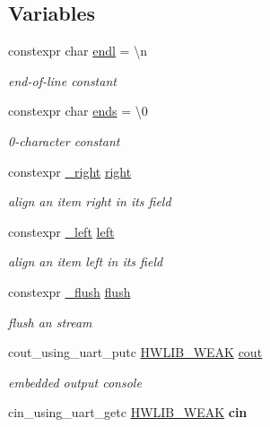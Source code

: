 \subsection*{Variables}
\begin{DoxyCompactItemize}
\item 
constexpr char \hyperlink{namespacehwlib_a89ce110cc897f61657f1edca18e4cef7}{endl} = \textquotesingle{}\textbackslash{}n\textquotesingle{}\hypertarget{namespacehwlib_a89ce110cc897f61657f1edca18e4cef7}{}\label{namespacehwlib_a89ce110cc897f61657f1edca18e4cef7}

\begin{DoxyCompactList}\small\item\em end-\/of-\/line constant \end{DoxyCompactList}\item 
constexpr char \hyperlink{namespacehwlib_ac708935d0fc9beb71bb55a7c35e69a16}{ends} = \textquotesingle{}\textbackslash{}0\textquotesingle{}\hypertarget{namespacehwlib_ac708935d0fc9beb71bb55a7c35e69a16}{}\label{namespacehwlib_ac708935d0fc9beb71bb55a7c35e69a16}

\begin{DoxyCompactList}\small\item\em 0-\/character constant \end{DoxyCompactList}\item 
constexpr \hyperlink{structhwlib_1_1__right}{\+\_\+right} \hyperlink{namespacehwlib_a26a6aead1d4dc1a990ab77bf2b730740}{right}
\begin{DoxyCompactList}\small\item\em align an item right in its field \end{DoxyCompactList}\item 
constexpr \hyperlink{structhwlib_1_1__left}{\+\_\+left} \hyperlink{namespacehwlib_a7d9a4ef3e66da75048c5b3e67cf401d8}{left}
\begin{DoxyCompactList}\small\item\em align an item left in its field \end{DoxyCompactList}\item 
constexpr \hyperlink{structhwlib_1_1__flush}{\+\_\+flush} \hyperlink{namespacehwlib_a648fe94ca9899747a632c23f97007732}{flush}
\begin{DoxyCompactList}\small\item\em flush an stream \end{DoxyCompactList}\item 
cout\+\_\+using\+\_\+uart\+\_\+putc \hyperlink{hwlib-defines_8hpp_a04be4340016df60d6636c1d1c6d94fc9}{H\+W\+L\+I\+B\+\_\+\+W\+E\+AK} \hyperlink{namespacehwlib_ac985c212834e4eb219aedede6efff2dc}{cout}
\begin{DoxyCompactList}\small\item\em embedded output console \end{DoxyCompactList}\item 
cin\+\_\+using\+\_\+uart\+\_\+getc \hyperlink{hwlib-defines_8hpp_a04be4340016df60d6636c1d1c6d94fc9}{H\+W\+L\+I\+B\+\_\+\+W\+E\+AK} {\bfseries cin}\hypertarget{namespacehwlib_a8f672f745fb7a27fe652c442779bd65d}{}\label{namespacehwlib_a8f672f745fb7a27fe652c442779bd65d}


\end{DoxyCompactItemize}
